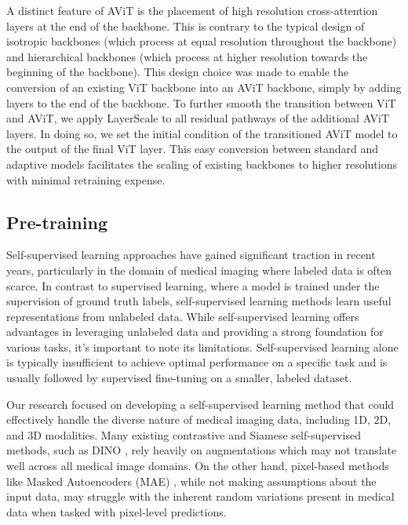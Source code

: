 \documentclass[12pt]{article}
\begin{document}
A distinct feature of AViT is the placement of high resolution cross-attention layers at the end of the backbone. This is contrary to the typical design of isotropic backbones 
(which process at equal resolution throughout the backbone) and hierarchical backbones (which process at higher resolution towards the beginning of the backbone). This design choice
was made to enable the conversion of an existing ViT backbone into an AViT backbone, simply by adding layers to the end of the backbone. 
To further smooth the transition between ViT and AViT, we apply LayerScale \cite{touvron2021deeper} to all residual pathways of the additional AViT layers. In doing so, we set the initial condition of the transitioned AViT model to the output of the final ViT layer.
This easy conversion between standard and adaptive
models facilitates the scaling of existing backbones to higher resolutions with minimal retraining expense.


\subsection{Pre-training}

Self-supervised learning approaches have gained significant traction in recent years, particularly in the domain of medical imaging where labeled data is often scarce. 
In contrast to supervised learning, where a model is trained under the supervision of ground truth labels,
self-supervised learning methods learn useful representations from unlabeled data. 
While self-supervised learning offers advantages in leveraging unlabeled data and providing a strong foundation for various tasks, it's important to note its limitations. Self-supervised learning alone is typically insufficient to achieve optimal performance on a specific task and is usually followed by supervised fine-tuning on a smaller, labeled dataset.

Our research focused on developing a self-supervised learning method that could effectively handle the diverse nature of medical imaging data, including 1D, 2D, and 3D modalities.
Many existing contrastive and Siamese self-supervised methods, such as DINO \cite{caron2021emerging}, rely heavily on augmentations which may not translate well across all medical image domains. On the other hand, pixel-based methods like Masked Autoencoders (MAE) \cite{he2022masked}, while not making assumptions about the input data, may struggle with the inherent random variations present in medical data when tasked with pixel-level predictions.
\end{document}

